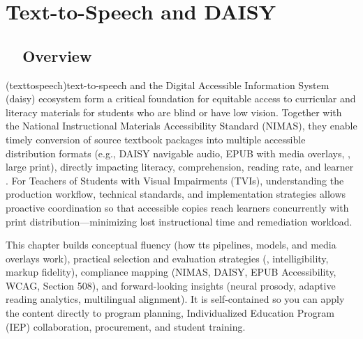 \chapter{Text-to-Speech and DAISY}\label{ch7:chap:text-to-speech-daisy}
\raggedright

\section{~~Overview}\label{ch07:sec:overview}
 (\gls{texttospeech})text-to-speech and the Digital Accessible Information System
(\gls{daisy}) ecosystem form a critical foundation for equitable 
access to curricular and literacy materials for students who are blind or have low vision. Together with
the National Instructional Materials Accessibility Standard (NIMAS), they enable timely
conversion of source textbook packages into multiple accessible distribution formats (e.g., DAISY
navigable audio, EPUB with media overlays, , large print), directly impacting
literacy, comprehension, reading rate, and learner . For Teachers of Students with
Visual Impairments (TVIs), understanding the production workflow, technical standards, and implementation
strategies allows proactive coordination so that accessible copies reach learners concurrently with print
distribution—minimizing lost instructional time and remediation workload.

This chapter builds conceptual fluency (how \gls{tts} pipelines,  models, and media overlays work),
practical selection and evaluation strategies (, intelligibility, markup fidelity), compliance
mapping (NIMAS, DAISY, EPUB Accessibility, WCAG, Section 508), and forward-looking insights (neural
prosody, adaptive reading analytics, multilingual alignment). It is self-contained so you can apply the
content directly to program planning, Individualized Education Program (IEP) collaboration, procurement,
and student training.

